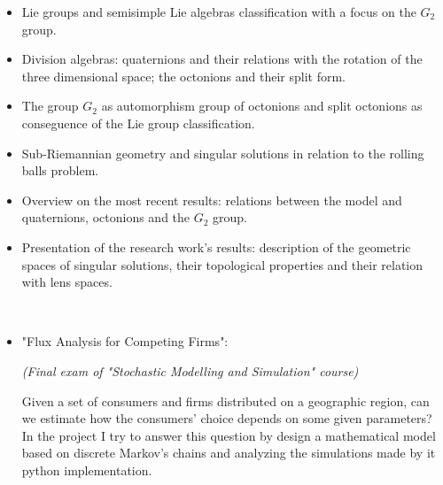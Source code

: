 \documentclass[10pt,a4paper]{altacv}
\begin{document}
\begin{itemize}
\item Lie groups and semisimple Lie algebras classification with a focus on the $G_2$ group.
\item Division algebras: quaternions and their relations with the rotation of the three dimensional space; the octonions and their split form.
\item The group $G_2$ as automorphism group of octonions and split octonions as conseguence of the Lie group classification.
\item Sub-Riemannian geometry and  singular solutions in relation to the rolling balls problem.
\item Overview on the most recent results: relations between the model and quaternions, octonions and the $G_2$ group.  

\item Presentation of the research work's results: description of the geometric spaces of singular solutions, their topological properties and their relation with lens spaces.



\end{itemize}
	
\
\\


\begin{itemize}
\item "Flux Analysis for Competing Firms": 

\textit{(Final exam of "Stochastic Modelling and Simulation" course)}

Given a set of consumers and firms distributed on a geographic region, can we estimate how the consumers' choice depends on some given parameters? In the project I try to answer this question by design a mathematical model based on discrete Markov's chains and analyzing the simulations made by it python implementation.
\end{itemize}



\end{document}
